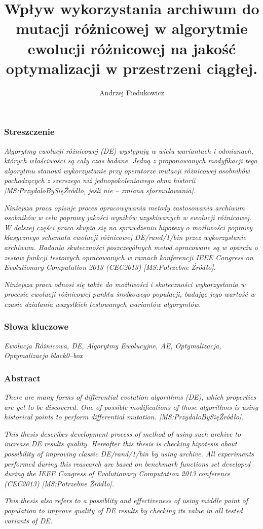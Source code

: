 \documentclass[11pt,a4paper]{report}
\title{\textbf{Wpływ wykorzystania archiwum do mutacji różnicowej w algorytmie ewolucji różnicowej na jakość optymalizacji w przestrzeni ciągłej.}}
\author{Andrzej Fiedukowicz}
\date{}
\begin{document}

\maketitle
\tableofcontents

\newpage
\subsubsection{Streszczenie}
\par{
\emph{
Algorytmy ewolucji różnicowej (DE) występują w wielu wariantach i odmianach, których właściwości są cały czas badane. Jedną z proponowanych modyfikacji tego algorytmu stanowi wykorzystanie przy operatorze mutacji różnicowej osobników pochodzących z szerszego niż jednopokoleniowego okna historii [MS:PrzydaloBySięŹródło, jeśli nie -- zmiana sformułowania].
}
}
\par{
\emph{
Niniejsza praca opisuje proces opracowywania metody zastosowania archiwum osobników w celu poprawy jakości wyników uzyskiwanych w ewolucji różnicowej. W dalszej części praca skupia się na sprawdzeniu hipotezy o możliwości poprawy klasycznego schematu ewolucji różnicowej DE/rand/1/bin przez wykorzystanie archiwum.
Badania skuteczności poszczególnych metod opracowane są w oparciu o zestaw funkcji testowych opracowanych w ramach konferencji IEEE Congress on Evolutionary Computation 2013 (CEC2013) [MS:Potrzebne Źródło].
}
}
\par{
\emph{
Niniejsza praca odnosi się także do możliwości i skuteczności wykorzystania w procesie ewolucji różnicowej punktu środkowego populacji, badając jego wartość w czasie działania wszystkich testowanych wariantów algorymtów.
}
}
\subsubsection{Słowa kluczowe}
\par{
\emph{Ewolucja Różnicowa, DE, Algorytmy Ewolucyjne, AE, Optymalizacja, Optymalizacja black0--box}
}
\subsubsection{Abstract}
\par{
\emph{There are many forms of differential evolution algorithms (DE), which properties are yet to be discovered. One of possible modifications of those algorithms is using historical points to perform differential mutation. [MS:PrzydałoBySięŹródło]}.
}
\par{
\emph{
This thesis describes development process of method of using such archive to increase DE results quality. Hereafter this thesis is checking hipotesis about possibility of improving classic DE/rand/1/bin by using archive. All experiments performed during this reasearch are based on benchmark functions set developed during the IEEE Congress of Evolutionary Computation 2013 conference (CEC2013) [MS:Potrzebne Źródło].
}
}
\par{
\emph{
This thesis also refers to a possiblity and effectiveness of using middle point of population to improve quality of DE results by checking its value in all tested variants of DE. 
}
}
\end{document}
